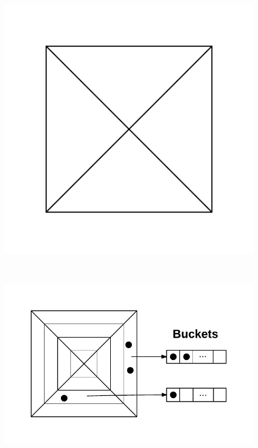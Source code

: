 \begin{figure}
		\begin{center}
			\begin{subfloat}{%
				\includegraphics[scale=0.5]{figures/pyramid_tree_partition.pdf}
			}
			\end{subfloat}~
			\begin{subfloat} {%
				\includegraphics[scale=0.5]{figures/pyramid_tree_buckets.pdf}
			}
			\end{subfloat}

\end{center}
\end{figure}
